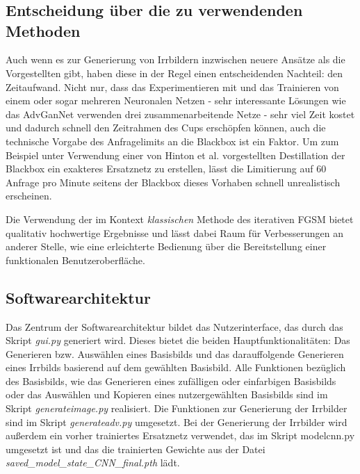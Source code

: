 \chapter{}
\label{cha:methods}

\section{Entscheidung über die zu verwendenden Methoden}

Auch wenn es zur Generierung von Irrbildern inzwischen neuere Ansätze als die Vorgestellten gibt, haben diese in der Regel einen entscheidenden Nachteil: den Zeitaufwand. Nicht nur, dass das Experimentieren mit und das Trainieren von einem oder sogar mehreren Neuronalen Netzen - sehr interessante Lösungen wie das AdvGanNet \cite{conf/ijcai/XiaoLZHLS18} verwenden drei zusammenarbeitende Netze - sehr viel Zeit kostet und dadurch schnell den Zeitrahmen des Cups erschöpfen können, auch die technische Vorgabe des Anfragelimits an die Blackbox ist ein Faktor. Um zum Beispiel unter Verwendung einer von Hinton et al. \cite{journals/corr/HintonVD15} vorgestellten Destillation der Blackbox ein exakteres Ersatznetz zu erstellen, lässt die Limitierung auf 60 Anfrage pro Minute seitens der Blackbox dieses Vorhaben schnell unrealistisch erscheinen.

Die Verwendung der im Kontext \textit{klassischen} Methode des iterativen FGSM bietet qualitativ hochwertige Ergebnisse und lässt dabei Raum für Verbesserungen an anderer Stelle, wie eine erleichterte Bedienung über die Bereitstellung einer funktionalen Benutzeroberfläche.

\section{Softwarearchitektur}

Das Zentrum der Softwarearchitektur bildet das Nutzerinterface, das durch das Skript \textit{gui.py} generiert wird. Dieses bietet die beiden Hauptfunktionalitäten:
Das Generieren bzw. Auswählen eines Basisbilds und das darauffolgende Generieren eines Irrbilds basierend auf dem gewählten Basisbild.
Alle Funktionen bezüglich des Basisbilds, wie das Generieren eines zufälligen oder einfarbigen Basisbilds oder das Auswählen und Kopieren eines nutzergewählten Basisbilds sind im Skript \textit{generateimage.py} realisiert. 
Die Funktionen zur Generierung der Irrbilder sind im Skript \textit{generateadv.py} umgesetzt. Bei der Generierung der Irrbilder wird außerdem ein vorher trainiertes Ersatznetz verwendet, das im Skript modelcnn.py umgesetzt ist und das die trainierten Gewichte aus der Datei \textit{saved\_model\_state\_CNN\_final.pth} lädt.

